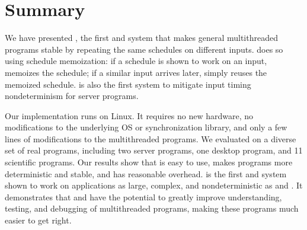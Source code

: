 \section{Summary}
\label{sec:tern-summary}

We have presented \tern, the first \smt and \dmt system that makes general
multithreaded programs stable by repeating the same schedules on different
inputs.  \tern does so using schedule memoization: if a schedule is shown
to work on an input, \tern memoizes the schedule; if a similar input
arrives later, \tern simply reuses the memoized schedule. \tern is also the
first \dmt system to mitigate input timing nondeterminism for server
programs.

Our \tern implementation runs on Linux.  It requires no new hardware, no
modifications to the underlying OS or synchronization library, and only a
few lines of modifications to the multithreaded programs.  We evaluated
\tern on a diverse set of real programs, including two server programs, one
desktop program, and 11 scientific programs.  Our results show that
\tern is easy to use, makes programs more deterministic and stable, and has
reasonable overhead.  \tern is the first \smt and \dmt system shown to work on
applications as large, complex, and nondeterministic as \mysql and \apache.
It demonstrates that \smt and \dmt have the potential to greatly improve
understanding, testing, and debugging of multithreaded programs, making these
programs much easier to get right.

